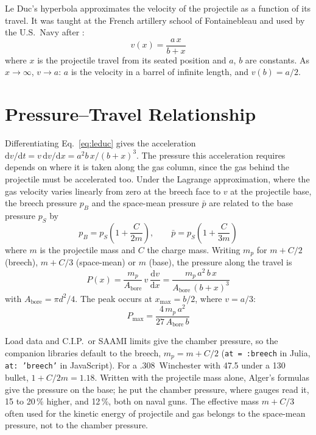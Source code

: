 \documentclass[11pt,twoside,openright]{report}
\newcommand{\dd}{\mathrm{d}}
\begin{document}
Le Duc's hyperbola approximates the velocity of the projectile as a function of its travel. It was taught at the French artillery school of Fontainebleau \citep{challeat1904affuts} and used by the U.S.\ Navy after \citet{alger1911leduc}:
\begin{equation}
  v(x) = \frac{a\,x}{b + x}
  \label{eq:leduc}
\end{equation}
where $x$ is the projectile travel from its seated position and $a$, $b$ are constants. As $x \to \infty$, $v \to a$: $a$ is the velocity in a barrel of infinite length, and $v(b) = a/2$.

\section{Pressure--Travel Relationship}

Differentiating Eq.~\eqref{eq:leduc} gives the acceleration $\dd v/\dd t = v\,\dd v/\dd x = a^2 b\,x/(b+x)^3$. The pressure this acceleration requires depends on where it is taken along the gas column, since the gas behind the projectile must be accelerated too. Under the Lagrange approximation, where the gas velocity varies linearly from zero at the breech face to $v$ at the projectile base, the breech pressure $p_B$ and the space-mean pressure $\bar{p}$ are related to the base pressure $p_S$ by \citep[p.~71, eqs.~3.54 and 3.59]{carlucci2007ballistics}
\begin{equation}
  p_B = p_S\left(1 + \frac{C}{2m}\right), \qquad \bar{p} = p_S\left(1 + \frac{C}{3m}\right)
  \label{eq:lagrange_gradient}
\end{equation}
where $m$ is the projectile mass and $C$ the charge mass. Writing $m_p$ for $m + C/2$ (breech), $m + C/3$ (space-mean) or $m$ (base), the pressure along the travel is
\begin{equation}
  P(x) = \frac{m_p}{A_{\mathrm{bore}}}\,v\,\frac{\dd v}{\dd x}
  = \frac{m_p\,a^2\,b\,x}{A_{\mathrm{bore}}\,(b+x)^3}
  \label{eq:pressure_leduc}
\end{equation}
with $A_{\mathrm{bore}} = \pi d^2/4$. The peak occurs at $x_{\max} = b/2$, where $v = a/3$:
\begin{equation}
  P_{\max} = \frac{4\,m_p\,a^2}{27\,A_{\mathrm{bore}}\,b}
  \label{eq:peak_pressure}
\end{equation}

Load data and C.I.P.\ or SAAMI limits give the chamber pressure, so the companion libraries default to the breech, $m_p = m + C/2$ (\texttt{at = :breech} in Julia, \texttt{at: 'breech'} in JavaScript). For a .308~Winchester with \SI{47.5}{\grain} under a \SI{130}{\grain} bullet, $1 + C/2m = 1.18$. Written with the projectile mass alone, Alger's formulas give the pressure on the base; he put the chamber pressure, where gauges read it, 15 to 20\,\% higher, and \citet{patterson1912leduc} 12\,\%, both on naval guns. The effective mass $m + C/3$ often used for the kinetic energy of projectile and gas belongs to the space-mean pressure, not to the chamber pressure.
\end{document}
